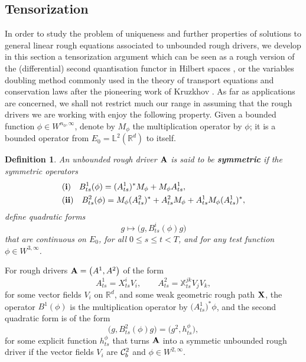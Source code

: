 \documentclass[11pt,a4paper]{amsart}
\newcommand{\RR}{\mathbb{R}}  \newcommand{\CC}{\mathbb{C}}  \newcommand{\LL}{\mathbb{L}}  \newcommand{\WW}{\mathbb{W}}
\newcommand{\bbX}{\mathbb{X}}
\renewcommand{\leq}{\leqslant}
\newtheorem{defn}[thm]{ \hspace{-0.3cm} {\sc Definition}}%
\numberwithin{equation}{section} %
\begin{document}
\bigskip


\subsection{Tensorization}
\label{SubsectionTensorization}

In order to study the problem of uniqueness and further properties of solutions to general linear rough equations associated to unbounded rough drivers, we develop in this section a tensorization argument which can be seen as a rough version of the (differential) second quantisation functor in Hilbert spaces \cite{ReedSimon}, or the variables doubling method commonly used in the theory of transport equations and conservation laws after the pioneering work of Kruzkhov \cite{Kruzkhov}. As far as applications are concerned, we shall not restrict much our range in assuming that the rough drivers we are working with enjoy the following property. Given a bounded function $\phi\in W^{n_0,\infty}$, denote by $M_\phi$ the multiplication operator by $\phi$; it is a bounded operator from $E_0 = \LL^2(\RR^d)$ to itself.

\begin{defn}
An unbounded rough driver $\bf A$ is said to be \textbf{\emph{symmetric}} if the symmetric operators 
\begin{equation*}
\begin{split}
&{\bf (i)}\quad B^1_{ts}(\phi) = (A^1_{ts})^*M_\phi  + M_\phi A^1_{ts} , \\
&{\bf (ii)}\quad B^2_{ts}(\phi) = M_\phi (A^2_{ts})^*  +  A^2_{ts}M_\phi + A_{ts}^1 M_\phi (A^1_{ts})^*,
\end{split}
\end{equation*}
define quadratic forms 
$$
g\mapsto \Big(g,B^i_{ts}(\phi)g\Big)
$$
that are continuous on $E_0$, for all $0\leq s\leq t<T$, and for any test function $\phi\in W^{3,\infty}$.
\end{defn}

For rough drivers ${\bf A} = \big(A^1,A^2\big)$ of the form 
$$
A^1_{ts} = X^i_{ts} V_i, \quad\quad A^2_{ts} = {\bbX}^{jk}_{ts} V_jV_k,
$$
for some vector fields $V_i$ on $\RR^d$, and some weak geometric rough path ${\bf X}$, the operator $B^1(\phi)$ is the multiplication operator by $\big(A^1_{ts}\big)^*\phi$, and the second quadratic form is of the form
$$
\Big(g,B^2_{ts}(\phi)g\Big) = \Big(g^2 , h^\phi_{ts}\Big),
$$
for some explicit function $h^\phi_{ts}$ that turns $\bf A$ into a symmetic unbounded rough driver if the vector fields $V_i$ are $\mathcal{C}^2_b$ and $\phi\in W^{2,\infty}$. 
\end{document}
